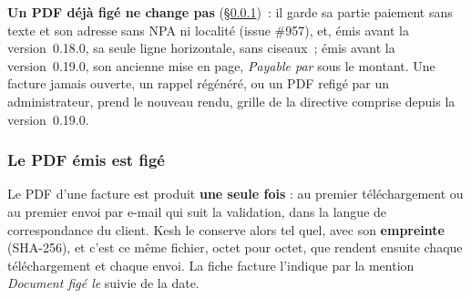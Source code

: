 \documentclass[a4paper,11pt,oneside]{article}
\begin{document}
\textbf{Un PDF déjà figé ne change pas} (\S\ref{sec:pdf-fige})~: il garde sa partie paiement sans texte et son adresse sans NPA ni localité (issue \#957), et, émis avant la version~0.18.0, sa seule ligne horizontale, sans ciseaux~; émis avant la version~0.19.0, son ancienne mise en page, \emph{Payable par} sous le montant. Une facture jamais ouverte, un rappel régénéré, ou un PDF refigé par un administrateur, prend le nouveau rendu, grille de la directive comprise depuis la version~0.19.0.

\subsubsection{Le PDF émis est figé}\label{sec:pdf-fige}

Le PDF d'une facture est produit \textbf{une seule fois} : au premier téléchargement ou au premier envoi par e-mail qui suit la validation, dans la langue de correspondance du client. Kesh le conserve alors tel quel, avec son \textbf{empreinte} (SHA-256), et c'est ce même fichier, octet pour octet, que rendent ensuite chaque téléchargement et chaque envoi. La fiche facture l'indique par la mention \emph{Document figé le} suivie de la date.
\end{document}
